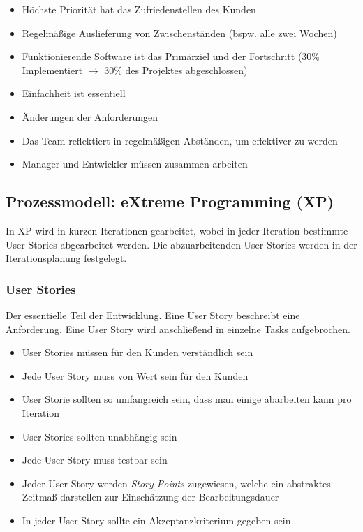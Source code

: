\documentclass[a4paper, 11pt, accentcolor = tud3b]{tudreport}
\begin{document}
				\begin{itemize}
					\item Höchste Priorität hat das Zufriedenstellen des Kunden
					\item Regelmäßige Auslieferung von Zwischenständen (bspw. alle zwei Wochen)
					\item Funktionierende Software ist das Primärziel und der Fortschritt (30\% Implementiert $ \rightarrow $ 30\% des Projektes abgeschlossen)
					\item Einfachheit ist essentiell
					\item Änderungen der Anforderungen
					\item Das Team reflektiert in regelmäßigen Abständen, um effektiver zu werden
					\item Manager und Entwickler müssen zusammen arbeiten
				\end{itemize}
			
			\subsection{Prozessmodell: eXtreme Programming (XP)}
				In XP wird in kurzen Iterationen gearbeitet, wobei in jeder Iteration bestimmte User Stories abgearbeitet werden. Die abzuarbeitenden User Stories werden in der Iterationsplanung festgelegt.

				\subsubsection{User Stories}
					Der essentielle Teil der Entwicklung. Eine User Story beschreibt eine Anforderung. Eine User Story wird anschließend in einzelne Tasks aufgebrochen.
					
					\begin{itemize}
						\item User Stories müssen für den Kunden verständlich sein
						\item Jede User Story muss von Wert sein für den Kunden
						\item User Storie sollten so umfangreich sein, dass man einige abarbeiten kann pro Iteration
						\item User Stories sollten unabhängig sein
						\item Jede User Story muss testbar sein
						\item Jeder User Story werden \textit{Story Points} zugewiesen, welche ein abstraktes Zeitmaß darstellen zur Einschätzung der Bearbeitungsdauer
						\item In jeder User Story sollte ein Akzeptanzkriterium gegeben sein
					\end{itemize}
					
\end{document}
